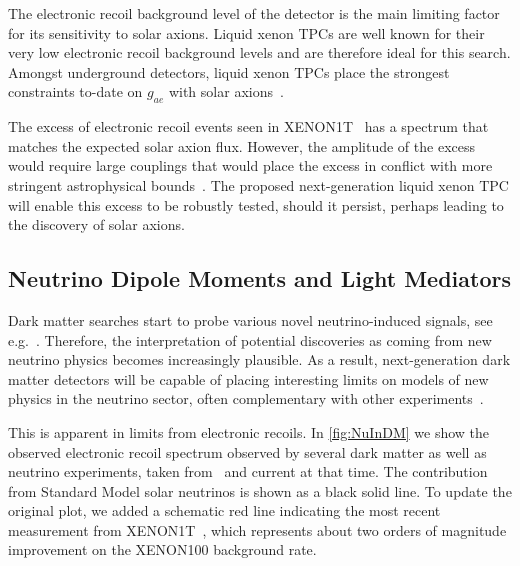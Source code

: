 The electronic recoil background level of the detector is the main limiting factor for its sensitivity to solar axions. Liquid xenon TPCs are well known for their very low electronic recoil background levels and are therefore ideal for this search. Amongst underground detectors, liquid xenon TPCs place the strongest constraints to-date on $g_{ae}$ with solar axions~\cite{Ahmed:2009ht,Abe:2012ut,Aprile:2014eoa,Akerib:2017uem,Fu:2017lfc,Aprile:2020tmw}. 

The excess of electronic recoil events seen in XENON1T~\cite{Aprile:2020tmw} has a spectrum that matches the expected solar axion flux. However, the amplitude of the excess would require large couplings that would place the excess in conflict with more stringent astrophysical bounds~\cite{Capozzi:2020cbu,Athron:2020maw,Li:2020naa,Croon:2020ehi}. The proposed next-generation liquid xenon TPC will enable this excess to be robustly tested, should it persist, perhaps leading to the discovery of solar axions.

\subsection{Neutrino Dipole Moments and Light Mediators}

Dark matter searches start to probe various novel neutrino-induced signals, see e.g.~\cite{Billard:2013qya,Link:2019pbm}. Therefore, the interpretation of potential discoveries as coming from new neutrino physics becomes increasingly plausible. As a result, next-generation dark matter detectors will be capable of placing interesting limits on models of new physics in the neutrino sector, often complementary with other experiments~\cite{Dutta:2020che}. 

This is apparent in limits from electronic recoils. In \autoref{fig:NuInDM} we show the observed electronic recoil spectrum observed by several dark matter as well as neutrino experiments, taken from~\cite{Harnik:2012ni} and current at that time. The contribution from Standard Model solar neutrinos is shown as a black solid line. To update the original plot, we added a schematic red line indicating the most recent measurement from XENON1T~\cite{Aprile:2017aty}, which represents about two orders of magnitude improvement on the XENON100 background rate. 

